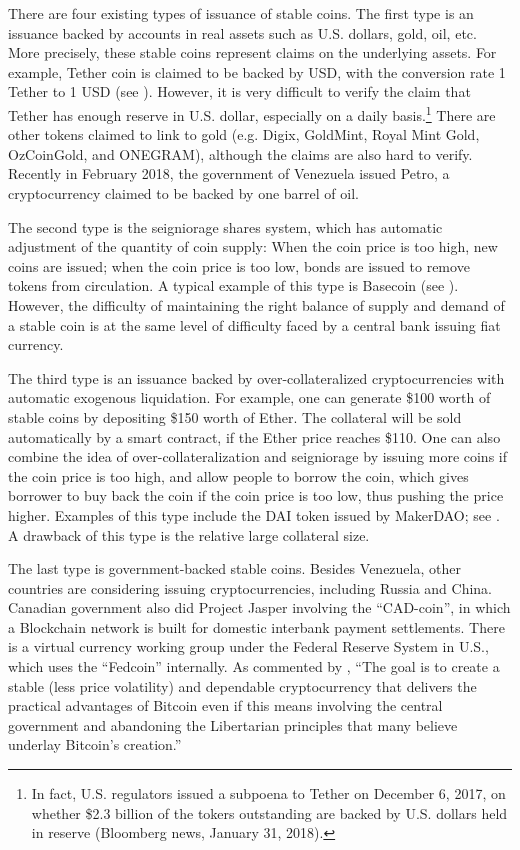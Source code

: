 \documentclass[11pt]{article}%
\numberwithin{equation}{section}
\theoremstyle{plain}
\begin{document}
There are four existing types of issuance of stable coins. The first type is an issuance backed by accounts in real assets such as U.S. dollars, gold, oil, etc. More precisely, these stable coins represent claims on the underlying assets. For example, Tether coin is claimed to be backed by USD, with the conversion rate  1 Tether to 1 USD (see \cite{tether_tether:_2016}). However, it is very difficult to verify the claim that Tether has enough reserve in U.S. dollar, especially on a daily basis.\footnote{
In fact, U.S. regulators issued a subpoena to Tether on December 6, 2017, on whether \$2.3 billion of the tokers outstanding are backed by U.S. dollars held in reserve (Bloomberg news, January 31, 2018).}
There are other tokens claimed to link to gold (e.g. Digix, GoldMint, Royal Mint Gold, OzCoinGold, and ONEGRAM), although the claims are also hard to verify. Recently in February 2018, the government of Venezuela issued Petro, a cryptocurrency claimed to be backed by one barrel of oil.

The second type is the seigniorage shares system, which has automatic adjustment of the quantity of coin supply: When the coin price is too high, new coins are issued; when the coin price is too low, bonds are issued to remove tokens from circulation. A typical example of this type is Basecoin (see \cite{al-naji_basecoin:_2018}). However, the difficulty of maintaining the right balance of supply and demand of a stable coin is at the same level of difficulty faced by a central bank issuing fiat currency.

The third type is an issuance backed by over-collateralized cryptocurrencies with automatic exogenous liquidation. 
For example, one can generate \$100 worth of stable coins by depositing \$150 worth of Ether. The collateral will be sold automatically by a smart contract, if the Ether price reaches \$110. 
One can also combine the idea of over-collateralization and seigniorage by issuing more coins if the coin price is too high, and allow people to borrow the coin, which gives borrower to buy back the coin if the coin price is too low, thus pushing the price higher. 
Examples of this type include the DAI token issued by MakerDAO; see \cite{makerteam__2017}. A drawback of this type is the relative large collateral size.



The last type is government-backed stable coins. Besides Venezuela, other countries are considering issuing cryptocurrencies, including Russia and China. Canadian government also did Project Jasper involving the ``CAD-coin'', in which a Blockchain network is built for domestic interbank payment settlements. There is a virtual currency working group under the Federal Reserve System in U.S., which uses the ``Fedcoin'' internally. As commented by \cite{garratt_cad-coin_2016}, ``The goal is to create a stable (less price volatility) and dependable cryptocurrency that delivers the practical advantages of Bitcoin even if this means involving the central government and abandoning the Libertarian principles that many believe underlay Bitcoin's creation.''
\end{document}
